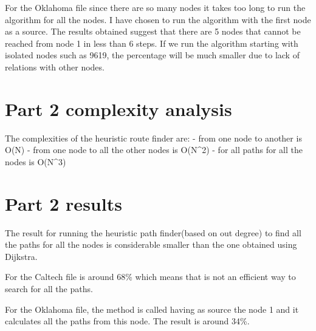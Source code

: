 \documentclass{article}
\begin{document}
For the Oklahoma file since there are so many nodes it takes too long to run the
algorithm for all the nodes. I have chosen to run the algorithm with the first
node as a source. The results obtained suggest that there are 5 nodes that cannot
be reached from node 1 in less than 6 steps.
If we run the algorithm starting with isolated nodes such as 9619, the percentage
will be much smaller due to lack of relations with other nodes.


\section{Part 2 complexity analysis}
\label{sec:complexity2}

The complexities of the heuristic route finder are:
  - from one node to another is O(N)
  - from one node to all the other nodes is O(N^2)
  - for all paths for all the nodes is O(N^3)

\section{Part 2 results}
\label{sec:part2}

The result for running the heuristic path finder(based on out degree) to find
all the paths for all the nodes is considerable smaller than the one obtained
using Dijkstra.

For the Caltech file is around 68\% which means that is not an efficient way to
search for all the paths.

For the Oklahoma file, the method is called having as source the node 1 and it
calculates all the paths from this node. The result is around 34\%.
\end{document}
